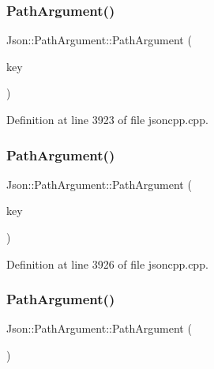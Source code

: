 \subsubsection{\texorpdfstring{Path\+Argument()}{PathArgument()}\hspace{0.1cm}{\footnotesize\ttfamily [3/8]}}
{\footnotesize\ttfamily Json\+::\+Path\+Argument\+::\+Path\+Argument (\begin{DoxyParamCaption}\item[{const char $\ast$}]{key }\end{DoxyParamCaption})}



Definition at line 3923 of file jsoncpp.\+cpp.

\hypertarget{class_json_1_1_path_argument_ac15f25452124fbf21218897113015301}{}\label{class_json_1_1_path_argument_ac15f25452124fbf21218897113015301} 
\subsubsection{\texorpdfstring{Path\+Argument()}{PathArgument()}\hspace{0.1cm}{\footnotesize\ttfamily [4/8]}}
{\footnotesize\ttfamily Json\+::\+Path\+Argument\+::\+Path\+Argument (\begin{DoxyParamCaption}\item[{const \hyperlink{config_8h_a1e723f95759de062585bc4a8fd3fa4be}{J\+S\+O\+N\+C\+P\+P\+\_\+\+S\+T\+R\+I\+NG} \&}]{key }\end{DoxyParamCaption})}



Definition at line 3926 of file jsoncpp.\+cpp.

\hypertarget{class_json_1_1_path_argument_a3c96ed20c56a55eb76d37a11553c528e}{}\label{class_json_1_1_path_argument_a3c96ed20c56a55eb76d37a11553c528e} 
\subsubsection{\texorpdfstring{Path\+Argument()}{PathArgument()}\hspace{0.1cm}{\footnotesize\ttfamily [5/8]}}
{\footnotesize\ttfamily Json\+::\+Path\+Argument\+::\+Path\+Argument (\begin{DoxyParamCaption}{ }\end{DoxyParamCaption})}

